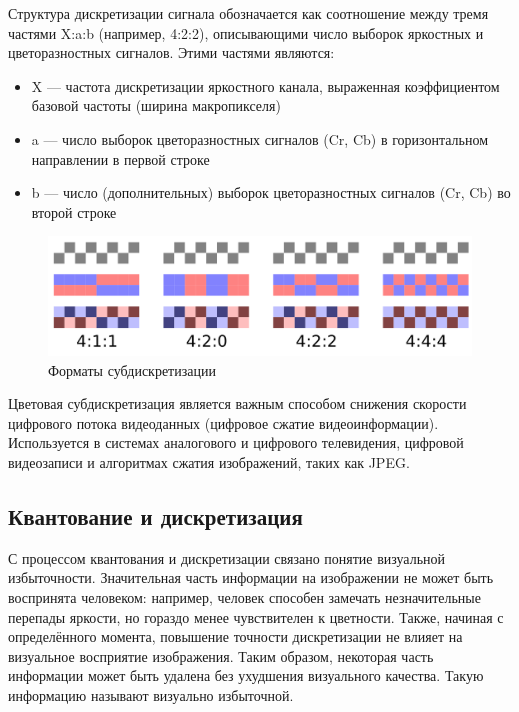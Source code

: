 Структура дискретизации сигнала обозначается как соотношение между тремя частями X:a:b (например, 4:2:2), описывающими число выборок яркостных и цветоразностных сигналов. Этими частями являются:

\begin{itemize}
	
	\item X — частота дискретизации яркостного канала, выраженная коэффициентом базовой частоты (ширина макропикселя)
	
	\item a — число выборок цветоразностных сигналов (Cr, Cb) в горизонтальном направлении в первой строке
	
	\item b — число (дополнительных) выборок цветоразностных сигналов (Cr, Cb) во второй строке
	
\end{itemize}


\begin{figure}[H]
	\begin{center}
		\includegraphics[scale=0.35]{pics/chroma_subsampling/chroma_subsampling_ratios.png}
		\caption{Форматы субдискретизации} 
		\label{pic:chroma_subsampling}
	\end{center}
\end{figure}

Цветовая субдискретизация является важным способом снижения скорости цифрового потока видеоданных (цифровое сжатие видеоинформации). Используется в системах аналогового и цифрового телевидения, цифровой видеозаписи и алгоритмах сжатия изображений, таких как JPEG.

\subsection*{Квантование и дискретизация}
С процессом квантования и дискретизации связано понятие визуальной избыточности. Значительная часть информации на изображении не может быть воспринята человеком: например, человек способен замечать незначительные перепады яркости, но гораздо менее чувствителен к цветности. Также, начиная с определённого момента, повышение точности дискретизации не влияет на визуальное восприятие изображения. Таким образом, некоторая часть информации может быть удалена без ухудшения визуального качества. Такую информацию называют визуально избыточной.

